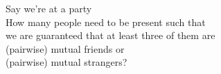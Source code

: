 \documentclass[preview]{standalone}
\begin{document}
\begin{center}
Say we're at a party \\ How many people need to be present such that \\ we are guaranteed that at least three of them are \\ (pairwise) mutual friends or\\  (pairwise) mutual strangers?
\end{center}
\end{document}
